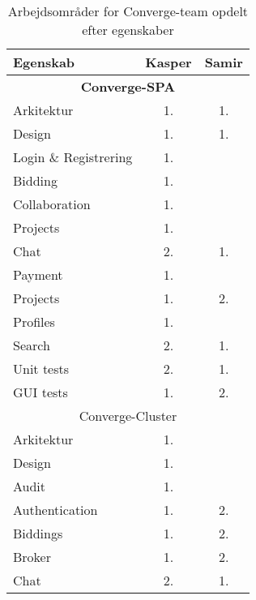 \begin{table}[H]
  \centering
  \caption{Arbejdsområder for Converge-team opdelt efter egenskaber}
  \label{tab:distribution-of-work}
  \begin{tabular}{lcc}
    \hline
    \textbf{Egenskab}      & \textbf{Kasper} & \textbf{Samir} \\ \hline
    \multicolumn{3}{c}{\textbf{Converge-SPA}}                 \\ \hline
    Arkitektur             & 1.              & 1.             \\
    Design                 & 1.              & 1.             \\
    Login \& Registrering  & 1.              &                \\
    Bidding                & 1.              &                \\
    Collaboration          & 1.              &                \\
    Projects               & 1.              &                \\
    Chat                   & 2.              & 1.             \\
    Payment                & 1.              &                \\
    Projects               & 1.              & 2.             \\
    Profiles               & 1.              &                \\
    Search                 & 2.              & 1.             \\
    Unit tests             & 2.              & 1.             \\
    GUI tests              & 1.              & 2.             \\ \hline
    \multicolumn{3}{c}{Converge-Cluster}                      \\ \hline
    Arkitektur             & 1.              &                \\
    Design                 & 1.              &                \\
    Audit                  & 1.              &                \\
    Authentication         & 1.              & 2.             \\
    Biddings               & 1.              & 2.             \\
    Broker                 & 1.              & 2.             \\
    Chat                   & 2.              & 1.             \\

\end{tabular}
\end{table}

